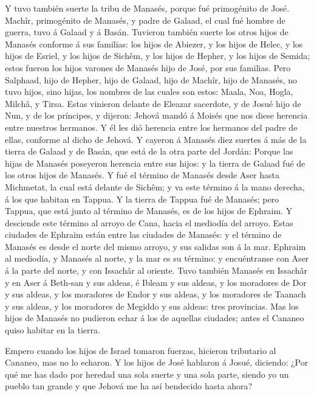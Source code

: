  Y tuvo también suerte la tribu de Manasés, porque fué
primogénito de José. Machîr, primogénito de Manasés, y padre de Galaad,
el cual fué hombre de guerra, tuvo á Galaad y á Basán. 
Tuvieron también suerte los otros hijos de Manasés conforme á sus
familias: los hijos de Abiezer, y los hijos de Helec, y los hijos de
Esriel, y los hijos de Sichêm, y los hijos de Hepher, y los hijos de
Semida; estos fueron los hijos varones de Manasés hijo de José, por sus
familias.  Pero Salphaad, hijo de Hepher, hijo de Galaad,
hijo de Machîr, hijo de Manasés, no tuvo hijos, sino hijas, los nombres
de las cuales son estos: Maala, Noa, Hogla, Milchâ, y Tirsa.
 Estas vinieron delante de Eleazar sacerdote, y de Josué
hijo de Nun, y de los príncipes, y dijeron: Jehová mandó á Moisés que
nos diese herencia entre nuestros hermanos. Y él les dió herencia entre
los hermanos del padre de ellas, conforme al dicho de Jehová.
 Y cayeron á Manasés diez suertes á más de la tierra de
Galaad y de Basán, que está de la otra parte del Jordán: 
Porque las hijas de Manasés poseyeron herencia entre sus hijos: y la
tierra de Galaad fué de los otros hijos de Manasés.  Y fué
el término de Manasés desde Aser hasta Michmetat, la cual está delante
de Sichêm; y va este término á la mano derecha, á los que habitan en
Tappua.  Y la tierra de Tappua fué de Manasés; pero Tappua,
que está junto al término de Manasés, es de los hijos de Ephraim.
 Y desciende este término al arroyo de Cana, hacia el
mediodía del arroyo. Estas ciudades de Ephraim están entre las ciudades
de Manasés: y el término de Manasés es desde el norte del mismo arroyo,
y sus salidas son á la mar.  Ephraim al mediodía, y Manasés
al norte, y la mar es su término: y encuéntranse con Aser á la parte del
norte, y con Issachâr al oriente.  Tuvo también Manasés en
Issachâr y en Aser á Beth-san y sus aldeas, é Ibleam y sus aldeas, y los
moradores de Dor y sus aldeas, y los moradores de Endor y sus aldeas, y
los moradores de Taanach y sus aldeas, y los moradores de Megiddo y sus
aldeas: tres provincias.  Mas los hijos de Manasés no
pudieron echar á los de aquellas ciudades; antes el Cananeo quiso
habitar en la tierra.

 Empero cuando los hijos de Israel tomaron fuerzas,
hicieron tributario al Cananeo, mas no lo echaron.  Y los
hijos de José hablaron á Josué, diciendo: ¿Por qué me has dado por
heredad una sola suerte y una sola parte, siendo yo un pueblo tan grande
y que Jehová me ha así bendecido hasta ahora?

